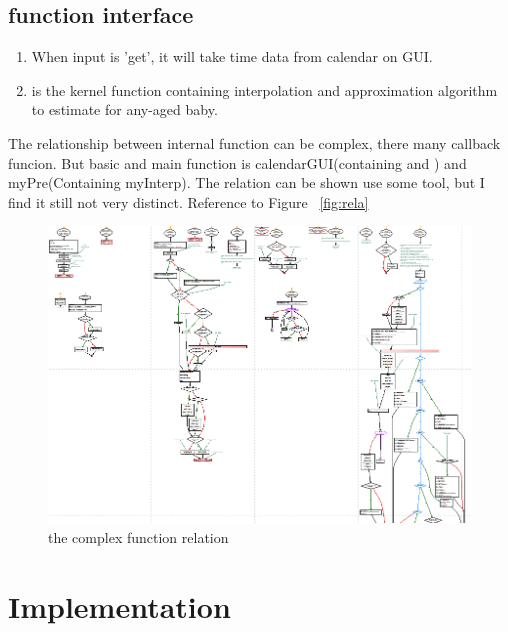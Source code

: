 \documentclass[
10pt, %
a4paper, %
oneside, %
headinclude,footinclude, %
BCOR5mm, %
]{scrartcl}
\begin{document}
\subsection{function interface}
\begin{enumerate}%
\item {} When input is 'get', it will take time data from calendar on GUI.
\item {} is the kernel function containing interpolation and approximation algorithm to estimate for any-aged baby.
\end{enumerate}
The relationship between internal function can be complex, there many callback funcion. But basic and main function is calendarGUI(containing  and ) and myPre(Containing myInterp). The relation can be shown use some tool, but I find it still not very distinct. Reference to Figure ~\vref{fig:rela}
\begin{figure}[tb]
\centering
\includegraphics[width=0.5\columnwidth]{./fig/rela.png}
\caption[relationship]{the complex function relation}
\label{fig:rela}
\end{figure}

\section{Implementation}
\end{document}
